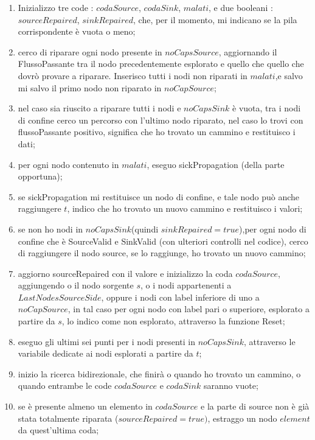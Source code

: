 \documentclass{article}
\begin{document}
\begin{enumerate}
    \item Inizializzo tre code : $codaSource$, $codaSink$, $malati$, e due booleani : $sourceRepaired$, $sinkRepaired$, che, per il momento, mi indicano se la pila corrispondente è vuota o meno;
    \item cerco di riparare ogni nodo presente in $noCapsSource$, aggiornando il FlussoPassante tra il nodo precedentemente esplorato e quello che quello che dovrò provare a riparare. Inserisco tutti i nodi non riparati in $malati$,e salvo mi salvo il primo nodo non riparato in $noCapSource$;
    \item nel caso sia riuscito a riparare tutti i nodi e $noCapsSink$ è vuota, tra i nodi di confine cerco un percorso con l'ultimo nodo riparato, nel caso lo trovi con flussoPassante positivo, significa che ho trovato un cammino e restituisco i dati;
    \item per ogni nodo contenuto in $malati$, eseguo sickPropagation (della parte opportuna);
    \item se sickPropagation mi restituisce un nodo di confine, e tale nodo può anche raggiungere $t$, indico che ho trovato un nuovo cammino e restituisco i valori;
    \item se non ho nodi in $noCapsSink$(quindi $sinkRepaired = true$),per ogni nodo di confine che è SourceValid e SinkValid (con ulteriori controlli nel codice), cerco di raggiungere il nodo source, se lo raggiunge, ho trovato un nuovo cammino;
    \item aggiorno sourceRepaired con il valore e inizializzo la coda $codaSource$, aggiungendo o il nodo sorgente $s$, o i nodi appartenenti a $LastNodesSourceSide$, oppure i nodi con label inferiore di uno a $noCapSource$, in tal caso per ogni nodo con label pari o superiore, esplorato a partire da $s$, lo indico come non esplorato, attraverso la funzione Reset;
    \item eseguo gli ultimi sei punti per i nodi presenti in $noCapsSink$, attraverso le variabile dedicate ai nodi esplorati a partire da $t$; %
    \item inizio la ricerca bidirezionale, che finirà o quando ho trovato un cammino, o quando entrambe le code $codaSource$ e $codaSink$ saranno vuote;
    \item se è presente almeno un elemento in $codaSource$ e la parte di source non è già stata totalmente riparata ($sourceRepaired = true)$, estraggo un nodo $element$ da quest'ultima coda;

\end{enumerate}
\end{document}
